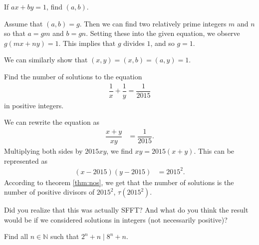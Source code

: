 \documentclass{subfile}
\begin{document}
		\begin{problem}
			If $ax+by=1$, find $(a,b)$.\label{prob:d1}
		\end{problem}

		\begin{solution}
			Assume that $(a,b)=g$. Then we can find two relatively prime integers $m$ and $n$ so that $a=gm$ and $b=gn$. Setting these into the given equation, we observe $g(mx+ny)=1$. This implies that $g$ divides $1$, and so $g=1$.
		\end{solution}

		\begin{note}
			We can similarly show that $(x,y)=(x,b)=(a,y)=1$.
		\end{note}

		\begin{problem}
			Find the number of solutions to the equation
			\begin{align*}
				\dfrac{1}{x}+\dfrac{1}{y}=\dfrac{1}{2015}
			\end{align*}
			in positive integers.
		\end{problem}

		\begin{solution}
			We can rewrite the equation as
				\begin{align*}
					\dfrac{x+y}{xy} & = \dfrac{1}{2015}.
				\end{align*}
			Multiplying both sides by $2015xy$, we find $xy=2015(x+y)$. This can be represented as
				\begin{align*}
					(x-2015)(y-2015) & = 2015^2.
				\end{align*}
			According to theorem \autoref{thm:nos}, we get that the number of solutions is the number of positive divisors of $2015^2$, $\tau(2015^2)$.
		\end{solution}

		\begin{note}
			Did you realize that this was actually SFFT? And what do you think the result would be if we considered solutions in integers (not necessarily positive)?
		\end{note}

		\begin{problem}
			Find all $n\in\mathbb{N}$ such that $2^n+n\mid 8^n+n$.
		\end{problem}
\end{document}
